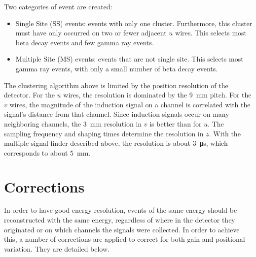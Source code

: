 \documentclass[herrin-thesis.tex]{subfiles}
\begin{document}
Two categories of event are created:
\begin{itemize}
\item Single Site (SS) events: events with only one cluster. Furthermore, this cluster must have only occurred on two or fewer adjacent \(u\) wires. This selects most beta decay events and few gamma ray events.
\item Multiple Site (MS) events: events that are not single site. This selects most gamma ray events, with only a small number of beta decay events.
\end{itemize}

The clustering algorithm above is limited by the position resolution of the detector. For the \(u\) wires, the resolution is dominated by the \SI{9}{\mm} pitch. For the \(v\) wires, the magnitude of the induction signal on a channel is correlated with the signal's distance from that channel. Since induction signals occur on many neighboring channels, the \SI{3}{\mm} resolution in \(v\) is better than for \(u\). The sampling frequency and shaping times determine the resolution in \(z\). With the multiple signal finder described above, the resolution is about \SI{3}{\micro\s}, which corresponds to about \SI{5}{\mm}.

\section{Corrections}
In order to have good energy resolution, events of the same energy should be reconstructed with the same energy, regardless of where in the detector they originated or on which channels the signals were collected. In order to achieve this, a number of corrections are applied to correct for both gain and positional variation. They are detailed below.
\end{document}
